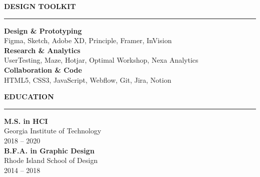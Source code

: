 \documentclass[10pt,letterpaper]{article}
\newcommand{\sidecvsection}[1]{%
  \vspace{3.5mm}%
  \noindent
  {\large\bfseries\color{accent}\MakeUppercase{#1}}\\[-1.5ex]%
  {\color{accent!30}\rule{\linewidth}{1.5pt}}%
  \vspace{2mm}%
}
\begin{document}
\begin{minipage}[t]{0.32\textwidth}
  \sidecvsection{Design Toolkit}
  \textbf{Design \& Prototyping} \\
  {\small Figma, Sketch, Adobe XD, Principle, Framer, InVision} \\[2mm]
  \textbf{Research \& Analytics} \\
  {\small UserTesting, Maze, Hotjar, Optimal Workshop, Nexa Analytics} \\[2mm]
  \textbf{Collaboration \& Code} \\
  {\small HTML5, CSS3, JavaScript, Webflow, Git, Jira, Notion}

  \sidecvsection{Education}
  \textbf{M.S. in HCI} \\
  {\small Georgia Institute of Technology} \\
  {\small\color{muted}2018 -- 2020} \\[2mm]
  \textbf{B.F.A. in Graphic Design} \\
  {\small Rhode Island School of Design} \\
  {\small\color{muted}2014 -- 2018}

\end{minipage}%
\hfill%
\end{document}
